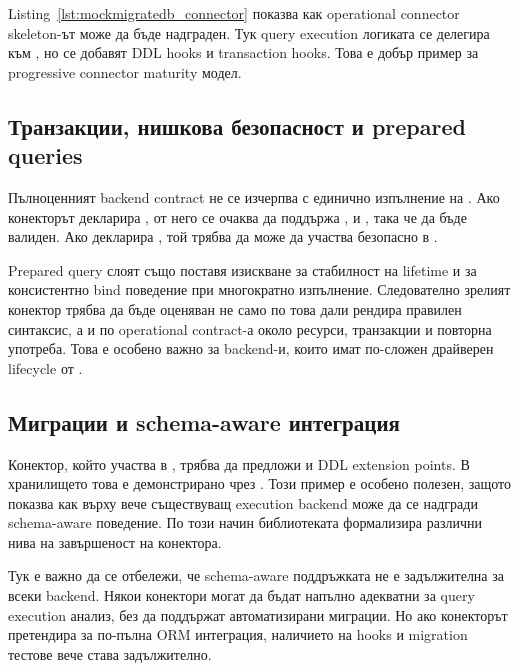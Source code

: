 Listing~\ref{lst:mockmigratedb_connector} показва как operational connector skeleton-ът може да бъде надграден. Тук query execution логиката се делегира към , но се добавят DDL hooks и transaction hooks. Това е добър пример за progressive connector maturity модел.

\subsection{Транзакции, нишкова безопасност и prepared queries}

Пълноценният backend contract не се изчерпва с единично изпълнение на . Ако конекторът декларира , от него се очаква да поддържа ,  и , така че  да бъде валиден. Ако декларира , той трябва да може да участва безопасно в .

Prepared query слоят също поставя изискване за стабилност на  lifetime и за консистентно bind поведение при многократно изпълнение. Следователно зрелият конектор трябва да бъде оценяван не само по това дали рендира правилен синтаксис, а и по operational contract-а около ресурси, транзакции и повторна употреба. Това е особено важно за backend-и, които имат по-сложен драйверен lifecycle от .

\subsection{Миграции и schema-aware интеграция}

Конектор, който участва в , трябва да предложи и DDL extension points. В хранилището това е демонстрирано чрез . Този пример е особено полезен, защото показва как върху вече съществуващ execution backend може да се надгради schema-aware поведение. По този начин библиотеката формализира различни нива на завършеност на конектора.

Тук е важно да се отбележи, че schema-aware поддръжката не е задължителна за всеки backend. Някои конектори могат да бъдат напълно адекватни за query execution анализ, без да поддържат автоматизирани миграции. Но ако конекторът претендира за по-пълна ORM интеграция, наличието на  hooks и migration тестове вече става задължително.

